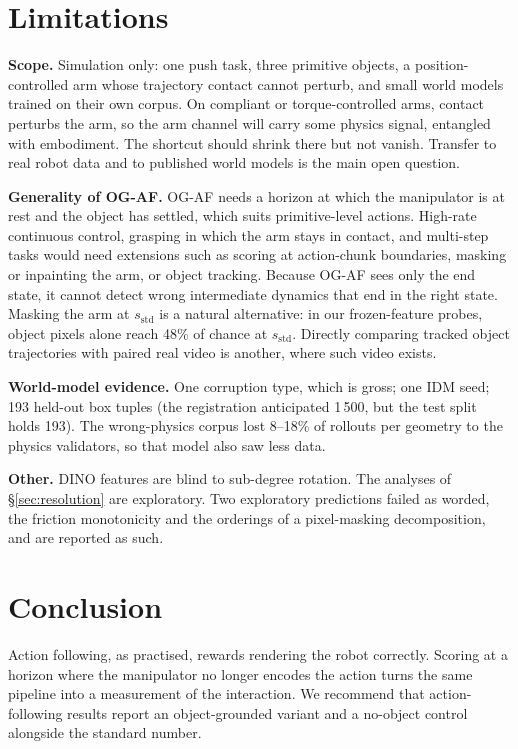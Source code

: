 \documentclass[10pt]{article}
\newcommand{\sstd}{s_{\mathrm{std}}}
\begin{document}
\section{Limitations}
\textbf{Scope.} Simulation only: one push task, three primitive objects, a
position-controlled arm whose trajectory contact cannot perturb, and small world models
trained on their own corpus. On compliant or torque-controlled arms, contact perturbs
the arm, so the arm channel will carry some physics signal, entangled with embodiment.
The shortcut should shrink there but not vanish. Transfer to real robot data and to
published world models is the main open question.
\par\textbf{Generality of OG-AF.} OG-AF needs a horizon at which the manipulator is at rest
and the object has settled, which suits primitive-level actions. High-rate continuous
control, grasping in which the arm stays in contact, and multi-step tasks would need
extensions such as scoring at action-chunk boundaries, masking or inpainting the arm,
or object tracking. Because OG-AF sees only the end state, it cannot detect wrong
intermediate dynamics that end in the right state. Masking the arm at $\sstd$ is a
natural alternative: in our frozen-feature probes, object pixels alone reach 48\% of
chance at $\sstd$. Directly comparing tracked object trajectories with paired real
video is another, where such video exists.
\par\textbf{World-model evidence.} One corruption type, which is gross; one IDM seed;
193 held-out box tuples (the registration anticipated 1\,500, but the test split holds
193). The wrong-physics corpus lost 8--18\% of rollouts per geometry to the physics
validators, so that model also saw less data.
\par\textbf{Other.} DINO features are blind to sub-degree rotation. The analyses of
\S\ref{sec:resolution} are exploratory. Two exploratory predictions failed as worded,
the friction monotonicity and the orderings of a pixel-masking decomposition, and are
reported as such.

\section{Conclusion}
Action following, as practised, rewards rendering the robot correctly. Scoring at a
horizon where the manipulator no longer encodes the action turns the same pipeline into
a measurement of the interaction. We recommend that action-following results report an
object-grounded variant and a no-object control alongside the standard number.
\end{document}
